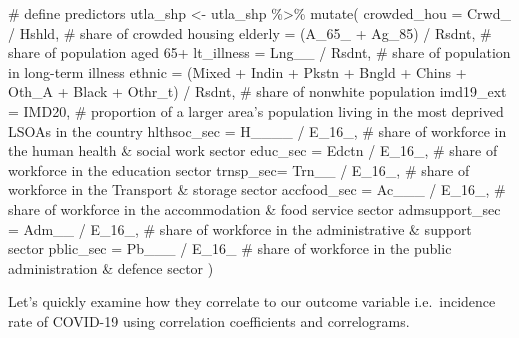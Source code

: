 \documentclass[
  letterpaper,
  DIV=11,
  numbers=noendperiod,
  oneside]{scrreprt}
\newenvironment{Shaded}{\begin{snugshade}}{\end{snugshade}}
\newcommand{\AttributeTok}[1]{\textcolor[rgb]{0.40,0.45,0.13}{#1}}
\newcommand{\CommentTok}[1]{\textcolor[rgb]{0.37,0.37,0.37}{#1}}
\newcommand{\FunctionTok}[1]{\textcolor[rgb]{0.28,0.35,0.67}{#1}}
\newcommand{\NormalTok}[1]{\textcolor[rgb]{0.00,0.23,0.31}{#1}}
\newcommand{\OtherTok}[1]{\textcolor[rgb]{0.00,0.23,0.31}{#1}}
\newcommand{\SpecialCharTok}[1]{\textcolor[rgb]{0.37,0.37,0.37}{#1}}
\begin{document}
\begin{Shaded}
\begin{Highlighting}[]
\CommentTok{\# define predictors}
\NormalTok{utla\_shp }\OtherTok{\textless{}{-}}\NormalTok{ utla\_shp }\SpecialCharTok{\%\textgreater{}\%} \FunctionTok{mutate}\NormalTok{(}
  \AttributeTok{crowded\_hou =}\NormalTok{ Crwd\_ }\SpecialCharTok{/}\NormalTok{ Hshld, }\CommentTok{\# share of crowded housing}
  \AttributeTok{elderly =}\NormalTok{ (A\_65\_ }\SpecialCharTok{+}\NormalTok{ Ag\_85) }\SpecialCharTok{/}\NormalTok{ Rsdnt, }\CommentTok{\# share of population aged 65+}
  \AttributeTok{lt\_illness =}\NormalTok{ Lng\_\_ }\SpecialCharTok{/}\NormalTok{ Rsdnt, }\CommentTok{\# share of population in long{-}term illness}
  \AttributeTok{ethnic =}\NormalTok{ (Mixed }\SpecialCharTok{+}\NormalTok{ Indin }\SpecialCharTok{+}\NormalTok{ Pkstn }\SpecialCharTok{+}\NormalTok{ Bngld }\SpecialCharTok{+}\NormalTok{ Chins }\SpecialCharTok{+}\NormalTok{ Oth\_A }\SpecialCharTok{+}\NormalTok{ Black }\SpecialCharTok{+}\NormalTok{ Othr\_t) }\SpecialCharTok{/}\NormalTok{ Rsdnt, }\CommentTok{\# share of nonwhite population}
  \AttributeTok{imd19\_ext =}\NormalTok{ IMD20, }\CommentTok{\# proportion of a larger area’s population living in the most deprived LSOAs in the country}
  \AttributeTok{hlthsoc\_sec =}\NormalTok{ H\_\_\_\_ }\SpecialCharTok{/}\NormalTok{ E\_16\_, }\CommentTok{\# share of workforce in the human health \& social work sector}
  \AttributeTok{educ\_sec =}\NormalTok{ Edctn }\SpecialCharTok{/}\NormalTok{ E\_16\_, }\CommentTok{\# share of workforce in the education sector}
  \AttributeTok{trnsp\_sec=}\NormalTok{ Trn\_\_ }\SpecialCharTok{/}\NormalTok{ E\_16\_, }\CommentTok{\# share of workforce in the Transport \& storage sector}
  \AttributeTok{accfood\_sec =}\NormalTok{ Ac\_\_\_ }\SpecialCharTok{/}\NormalTok{ E\_16\_, }\CommentTok{\# share of workforce in the accommodation \& food service sector}
  \AttributeTok{admsupport\_sec =}\NormalTok{ Adm\_\_ }\SpecialCharTok{/}\NormalTok{  E\_16\_, }\CommentTok{\# share of workforce in the administrative \& support sector}
  \AttributeTok{pblic\_sec =}\NormalTok{ Pb\_\_\_ }\SpecialCharTok{/}\NormalTok{ E\_16\_ }\CommentTok{\# share of workforce in the public administration \& defence sector}
\NormalTok{)}
\end{Highlighting}
\end{Shaded}

Let's quickly examine how they correlate to our outcome variable
i.e.~incidence rate of COVID-19 using correlation coefficients and
correlograms.
\end{document}

